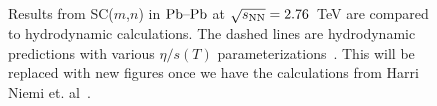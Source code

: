 \begin{figure}[h]
            \begin{center}
              \end{center}
        \caption{Results from SC($m$,$n$) in $\textnormal{Pb--Pb}$ at $\sqrt{s_{\textnormal{NN}}}=2.76$~TeV are compared to hydrodynamic calculations. The dashed lines are hydrodynamic predictions with various $\eta/s(T)$ parameterizations~\cite{Niemi:2015qia}. This will be replaced with new figures once we have the calculations from Harri Niemi et. al~\cite{Niemi:2015qia}.}
        \label{fig:Figure_5}
\end{figure}

